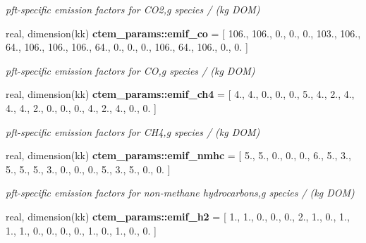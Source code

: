\begin{DoxyCompactItemize}
\begin{DoxyCompactList}\small\item\em pft-\/specific emission factors for C\+O2,g species / (kg D\+O\+M) \end{DoxyCompactList}\item 
\hypertarget{namespacectem__params_ad22701db48fc392e6905ec845347eb82}{}real, dimension(kk) {\bfseries ctem\+\_\+params\+::emif\+\_\+co} = \mbox{[} 106., 106., 0., 0., 0., 103., 106., 64., 106., 106., 106., 64., 0., 0., 0., 106., 64., 106., 0., 0. \mbox{]}\label{namespacectem__params_ad22701db48fc392e6905ec845347eb82}

\begin{DoxyCompactList}\small\item\em pft-\/specific emission factors for C\+O,g species / (kg D\+O\+M) \end{DoxyCompactList}\item 
\hypertarget{namespacectem__params_aa4e0d098146e23e88141b2d5804b6dfe}{}real, dimension(kk) {\bfseries ctem\+\_\+params\+::emif\+\_\+ch4} = \mbox{[} 4., 4., 0., 0., 0., 5., 4., 2., 4., 4., 4., 2., 0., 0., 0., 4., 2., 4., 0., 0. \mbox{]}\label{namespacectem__params_aa4e0d098146e23e88141b2d5804b6dfe}

\begin{DoxyCompactList}\small\item\em pft-\/specific emission factors for C\+H4,g species / (kg D\+O\+M) \end{DoxyCompactList}\item 
\hypertarget{namespacectem__params_a2e0fa2f6a9ef11fc839062a5649e17e7}{}real, dimension(kk) {\bfseries ctem\+\_\+params\+::emif\+\_\+nmhc} = \mbox{[} 5., 5., 0., 0., 0., 6., 5., 3., 5., 5., 5., 3., 0., 0., 0., 5., 3., 5., 0., 0. \mbox{]}\label{namespacectem__params_a2e0fa2f6a9ef11fc839062a5649e17e7}

\begin{DoxyCompactList}\small\item\em pft-\/specific emission factors for non-\/methane hydrocarbons,g species / (kg D\+O\+M) \end{DoxyCompactList}\item 
\hypertarget{namespacectem__params_a69c1ddbe45fc93ced2664f1fb1781431}{}real, dimension(kk) {\bfseries ctem\+\_\+params\+::emif\+\_\+h2} = \mbox{[} 1., 1., 0., 0., 0., 2., 1., 0., 1., 1., 1., 0., 0., 0., 0., 1., 0., 1., 0., 0. \mbox{]}\label{namespacectem__params_a69c1ddbe45fc93ced2664f1fb1781431}


\end{DoxyCompactItemize}
